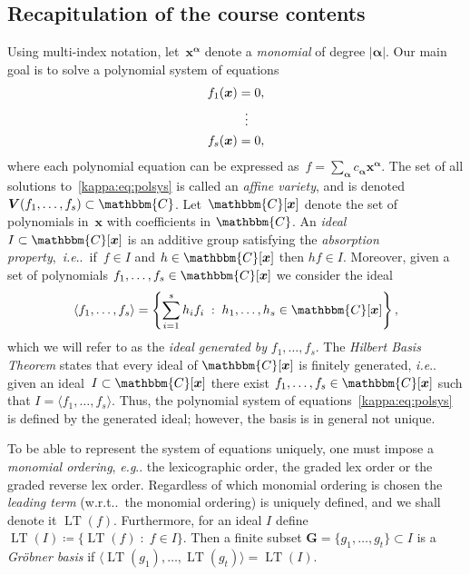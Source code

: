 \documentclass[11pt,a4paper]{article}
\makeatletter
\theoremstyle{definition}
\newcommand{\mat}[1]{\bm{#1}}
\newcommand{\C}{\ensuremath{\mathbbm{C}}}
\DeclareMathOperator{\lt}{LT}
\DeclareRobustCommand\eg{\emph{e.g}\@ifnextchar.{}{.\@}}
\DeclareRobustCommand\ie{\emph{i.e}\@ifnextchar.{}{.\@}}
\DeclareRobustCommand\wrt{w.r.t\@ifnextchar.{}{.\@}}
\makeatother
\begin{document}
\subsection{Recapitulation of the course contents}
Using multi-index notation,
let~$\mat{x^{\alpha}}$ denote a \emph{monomial} of degree $|\mat{\alpha}|$.
Our main goal is to solve a polynomial system of equations
\begin{equation}\label{kappa:eq:polsys}
    \begin{aligned}
    f_1(\mat{x}) & = 0, \\
                 & \hspace{0.575em} \vdots \\
    f_s(\mat{x}) & = 0,
    \end{aligned}
\end{equation}
where each polynomial equation can be expressed
as~$f=\sum_{\mat{\alpha}}c_{\mat{\alpha}}\mat{x^\alpha}$.
The set of all solutions to~\eqref{kappa:eq:polsys} is called an \emph{affine variety}, and is denoted
$\mat{V}(f_1,\ldots,f_s)\subset\C$.
Let~$\C[\mat{x}]$ denote the set
of polynomials in~$\mat{x}$ with coefficients in $\C$.
An \emph{ideal} $I\subset\C[\mat{x}]$ is an additive group satisfying the \emph{absorption property},~\ie{}~if~$f\in I$
and $h\in\C[\mat{x}]$ then $hf\in I$. Moreover, given a set of polynomials $f_1,\ldots,f_s\in\C[\mat{x}]$
we consider the ideal
\begin{equation}
\langle f_1,\ldots,f_s\rangle = \left\{\sum_{i=1}^sh_if_i\;:\;h_1,\ldots,h_s\in\C[\mat{x}]\right\},
\end{equation}
which we will refer to as the \emph{ideal generated by} $f_1,\ldots,f_s$.
The \emph{Hilbert Basis Theorem} states that every ideal of $\C[\mat{x}]$ is
finitely generated, \ie{} given an ideal~$I\subset\C[\mat{x}]$ there exist
$f_1,\ldots,f_s\in\C[\mat{x}]$ such that $I=\langle f_1,\ldots,f_s\rangle$.
Thus, the polynomial system of equations~\eqref{kappa:eq:polsys} is defined by the
generated ideal; however, the basis is in general not unique.

To be able to represent the system of equations uniquely, one must impose
a \emph{monomial ordering}, \eg{} the lexicographic order,
the graded lex order or the graded reverse lex order. Regardless of which monomial ordering
is chosen the \emph{leading term} (\wrt{}~the monomial ordering) is uniquely defined, and we shall
denote it $\lt(f)$. Furthermore, for an ideal $I$ define $\lt(I)\coloneqq\{\lt(f)\;:\;f\in I\}$. Then
a finite subset \mbox{$\mat{G}=\{g_1,\ldots,g_t\}\subset I$} is a \emph{Gröbner basis}
if $\langle\lt(g_1),\ldots,\lt(g_t)\rangle=\lt(I)$.
\end{document}
